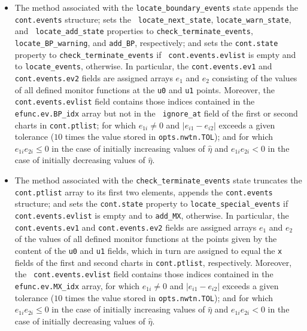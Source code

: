 \documentclass{article}
\begin{document}
\begin{itemize}
\item The method associated with the \texttt{locate\_boundary\_events} state
appends the \texttt{cont.events} structure; sets the \texttt{%
locate\_next\_state}, \texttt{locate\_warn\_state}, and \texttt{%
locate\_add\_state} properties to \texttt{check\_terminate\_events}, \texttt{%
locate\_BP\_warning}, and \texttt{add\_BP}, respectively; and sets the 
\texttt{cont.state} property to \texttt{check\_terminate\_events} if \texttt{%
cont.events.evlist} is empty and to \texttt{locate\_events}, otherwise. In
particular, the \texttt{cont.events.ev1} and \texttt{cont.events.ev2} fields
are assigned arrays $e_{1}$ and $e_{2}$ consisting of the values of all
defined monitor functions at the \texttt{u0} and \texttt{u1} points.
Moreover, the \texttt{cont.events.evlist} field contains those indices
contained in the \texttt{efunc.ev.BP\_idx} array but not in the \texttt{%
ignore\_at} field of the first or second charts in \texttt{cont.ptlist}; for
which $e_{1i}\neq 0$ and $\left| e_{i1}-e_{i2}\right| $ exceeds a given
tolerance ($10$ times the value stored in \texttt{opts.nwtn.TOL}); and for
which $e_{1i}e_{2i}\leq 0$ in the case of initially increasing values of $%
\hat{\eta}$ and $e_{1i}e_{2i}<0$ in the case of initially decreasing values
of $\hat{\eta}$.

\item The method associated with the \texttt{check\_terminate\_events} state
truncates the \texttt{cont.ptlist} array to its first two elements, appends
the \texttt{cont.events} structure; and sets the \texttt{cont.state}
property to \texttt{locate\_special\_events} if \texttt{cont.events.evlist}
is empty and to \texttt{add\_MX}, otherwise. In particular, the \texttt{%
cont.events.ev1} and \texttt{cont.events.ev2} fields are assigned arrays $%
e_{1}$ and $e_{2}$ of the values of all defined monitor functions at the
points given by the content of the \texttt{u0} and \texttt{u1} fields, which
in turn are assigned to equal the \texttt{x} fields of the first and second
charts in \texttt{cont.ptlist}, respectively. Moreover, the \texttt{%
cont.events.evlist} field contains those indices contained in the \texttt{%
efunc.ev.MX\_idx} array, for which $e_{1i}\neq 0$ and $\left|
e_{i1}-e_{i2}\right| $ exceeds a given tolerance ($10$ times the value
stored in \texttt{opts.nwtn.TOL}); and for which $e_{1i}e_{2i}\leq 0$ in the
case of initially increasing values of $\hat{\eta}$ and $e_{1i}e_{2i}<0$ in
the case of initially decreasing values of $\hat{\eta}$.


\end{itemize}
\end{document}
